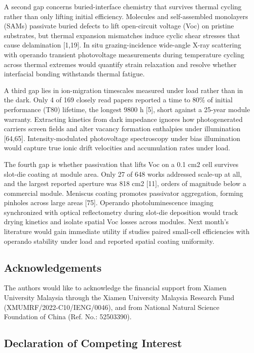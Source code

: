 \documentclass[
  11pt,
]{article}
\begin{document}
A second gap concerns buried-interface chemistry that survives thermal
cycling rather than only lifting initial efficiency. Molecules and
self-assembled monolayers (SAMs) passivate buried defects to lift
open-circuit voltage (Voc) on pristine substrates, but thermal expansion
mismatches induce cyclic shear stresses that cause delamination
{[}1,19{]}. In situ grazing-incidence wide-angle X-ray scattering with
operando transient photovoltage measurements during temperature cycling
across thermal extremes would quantify strain relaxation and resolve
whether interfacial bonding withstands thermal fatigue.

A third gap lies in ion-migration timescales measured under load rather
than in the dark. Only 4 of 169 closely read papers reported a time to
80\% of initial performance (T80) lifetime, the longest 9800 h {[}5{]},
short against a 25-year module warranty. Extracting kinetics from dark
impedance ignores how photogenerated carriers screen fields and alter
vacancy formation enthalpies under illumination {[}64,65{]}.
Intensity-modulated photovoltage spectroscopy under bias illumination
would capture true ionic drift velocities and accumulation rates under
load.

The fourth gap is whether passivation that lifts Voc on a 0.1 cm2 cell
survives slot-die coating at module area. Only 27 of 648 works addressed
scale-up at all, and the largest reported aperture was 818 cm2 {[}11{]},
orders of magnitude below a commercial module. Meniscus coating promotes
passivator aggregation, forming pinholes across large areas {[}75{]}.
Operando photoluminescence imaging synchronized with optical
reflectometry during slot-die deposition would track drying kinetics and
isolate spatial Voc losses across modules. Next month's literature would
gain immediate utility if studies paired small-cell efficiencies with
operando stability under load and reported spatial coating uniformity.

\subsection{Acknowledgements}\label{acknowledgements}

The authors would like to acknowledge the financial support from Xiamen
University Malaysia through the Xiamen University Malaysia Research Fund
(XMUMRF/2022-C10/IENG/0046), and from National Natural Science
Foundation of China (Ref. No.: 52503390).

\subsection{Declaration of Competing
Interest}\label{declaration-of-competing-interest}
\end{document}
